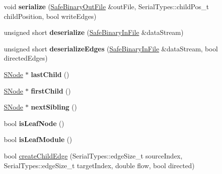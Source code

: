 \begin{DoxyCompactItemize}
void {\bfseries serialize} (\mbox{\hyperlink{classSafeBinaryOutFile}{Safe\+Binary\+Out\+File}} \&out\+File, Serial\+Types\+::child\+Pos\+\_\+t child\+Position, bool write\+Edges)
\item 
\mbox{\label{classSNode_a6270fde1ca7b59a9c7a7204dce89c9e1}} 
unsigned short {\bfseries deserialize} (\mbox{\hyperlink{classSafeBinaryInFile}{Safe\+Binary\+In\+File}} \&data\+Stream)
\item 
\mbox{\label{classSNode_a7db6da933f3a50fdb3200818696dcf3b}} 
unsigned short {\bfseries deserialize\+Edges} (\mbox{\hyperlink{classSafeBinaryInFile}{Safe\+Binary\+In\+File}} \&data\+Stream, bool directed\+Edges)
\item 
\mbox{\label{classSNode_a038fe3dbfc7fe3f3891c4a0e03c138d1}} 
\mbox{\hyperlink{classSNode}{S\+Node}} $\ast$ {\bfseries last\+Child} ()
\item 
\mbox{\label{classSNode_aae3d830c1aa363144d4d25efae28f047}} 
\mbox{\hyperlink{classSNode}{S\+Node}} $\ast$ {\bfseries first\+Child} ()
\item 
\mbox{\label{classSNode_a51c7d8160b22b5dcc60ed358d1338183}} 
\mbox{\hyperlink{classSNode}{S\+Node}} $\ast$ {\bfseries next\+Sibling} ()
\item 
\mbox{\label{classSNode_aa59e0459f89683aadb5ba4d2a54873dc}} 
bool {\bfseries is\+Leaf\+Node} ()
\item 
\mbox{\label{classSNode_aa6e9724b77b03f2cd783b3cb6f278024}} 
bool {\bfseries is\+Leaf\+Module} ()
\item 
bool \mbox{\hyperlink{classSNode_ae6682b903bf066ca1b3d71403f92d9d7}{create\+Child\+Edge}} (Serial\+Types\+::edge\+Size\+\_\+t source\+Index, Serial\+Types\+::edge\+Size\+\_\+t target\+Index, double flow, bool directed)
\end{DoxyCompactItemize}
